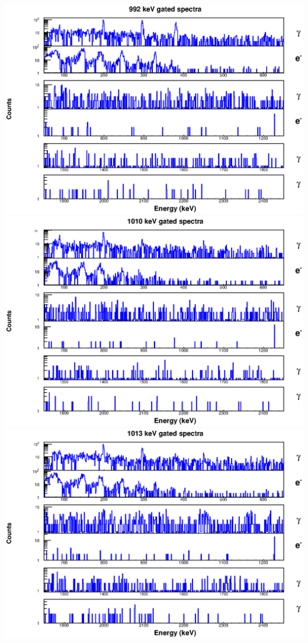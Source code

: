 \includegraphics[scale=0.8]{156Gd_Appendix/992_combined.eps}
\includegraphics[scale=0.8]{156Gd_Appendix/1010_combined.eps}
\includegraphics[scale=0.8]{156Gd_Appendix/1013_combined.eps}
